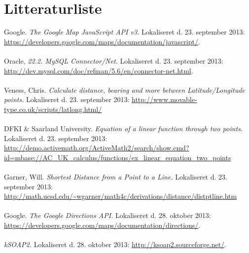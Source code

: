 \documentclass[Main.tex]{subfiles}
\begin{document}
\section{Litteraturliste}

Google. \textit{The Google Map JavaScript API v3.} Lokaliseret d. 23. september 2013: \url{https://developers.google.com/maps/documentation/javascript/}.\\
\\
Oracle, \textit{22.2. MySQL Connector/Net.} Lokaliseret d. 23. september 2013: \url{http://dev.mysql.com/doc/refman/5.6/en/connector-net.html}.\\
\\
Veness, Chris. \textit{Calculate distance, bearing and more between Latitude/Longitude points.} Lokaliseret d. 23. september 2013: \url{http://www.movable-type.co.uk/scripts/latlong.html/}\\
\\
DFKI \& Saarland University. \textit{Equation of a linear function through two points.} Lokaliseret d. 23. september 2013: \url{http://demo.activemath.org/ActiveMath2/search/show.cmd?id=mbase://AC_UK_calculus/functions/ex_linear_equation_two_points}\\
\\
Garner, Will. \textit{Shortest Distance from a Point to a Line.} Lokaliseret d. 23. september 2013: \url{http://math.ucsd.edu/~wgarner/math4c/derivations/distance/distptline.htm}\\
\\
Google. \textit{The Google Directions API.} Lokaliseret d. 28. oktober 2013: \url{https://developers.google.com/maps/documentation/directions/}.\\
\\
\textit{kSOAP2.} Lokaliseret d. 28. oktober 2013: \url{http://ksoap2.sourceforge.net/}.\\
\\
\end{document}
